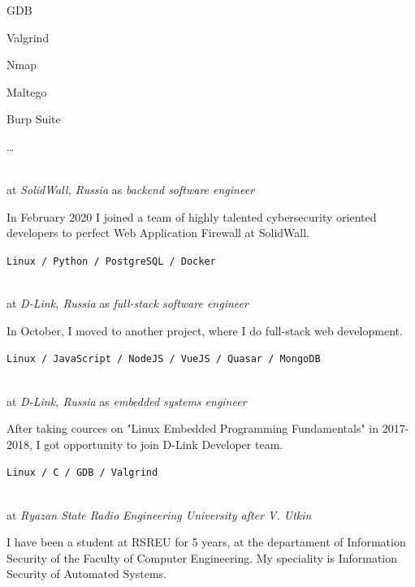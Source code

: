 \SmallSep

\begin{multicols}{3}
\begin{compactitem}[\color{Cyan}$\circ$]
    \item GDB
    \item Valgrind
    \item Nmap
    \item Maltego
    \item Burp Suite
    \item \ldots
\end{compactitem}
\end{multicols}

\Sep


 \\
at \textit{SolidWall, Russia}
as \textit{backend software engineer}
\SmallSep

In February 2020 I joined a team of highly talented cybersecurity oriented
developers to perfect Web Application Firewall at SolidWall.

\texttt{Linux / Python / PostgreSQL / Docker}
\SmallSep

 \\
at \textit{D-Link, Russia}
as \textit{full-stack software engineer}
\SmallSep

In October, I moved to another project, where I do full-stack web development.
\SmallSep

\texttt{Linux / JavaScript / NodeJS / VueJS / Quasar / MongoDB}
\SmallSep

\clearpage
\framebreak
\framebreak

 \\
at \textit{D-Link, Russia}
as \textit{embedded systems engineer}
\SmallSep

After taking cources on "Linux Embedded Programming Fundamentals" in
2017-2018, I got opportunity to join D-Link Developer team.
\SmallSep

\texttt{Linux / C / GDB / Valgrind}
\SmallSep

 \\
at \textit{Ryazan State Radio Engineering University after V. Utkin}
\SmallSep

I have been a student at RSREU for 5 years, at the departament of Information Security of the Faculty of Computer Engineering. My speciality is Information Security of Automated Systems.

